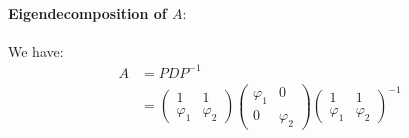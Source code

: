 \documentclass[]{article}
\begin{document}
\paragraph{Eigendecomposition of $A: $}
We have: 
\begin{align*}
	A&=PDP^{-1} \\
	&=
	\begin{pmatrix}
		1 & 1 \\ \varphi_1 & \varphi_2 
	\end{pmatrix} \begin{pmatrix}
		\varphi_1& 0 \\ 0 & \varphi_2
	\end{pmatrix}\begin{pmatrix}
		1 & 1 \\ \varphi_1 & \varphi_2
	\end{pmatrix}^{-1} 
\end{align*}
\end{document}
